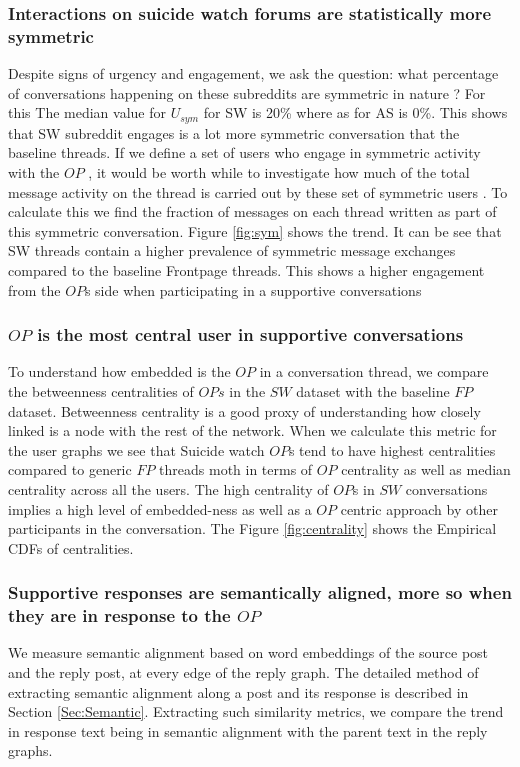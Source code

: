 \subsubsection{Interactions on suicide watch forums are statistically more symmetric}
Despite signs of urgency and engagement, we ask the question: what percentage of conversations happening on these subreddits are symmetric in nature ? 
For this The median value for $U_{sym}$ for SW is 20\% where as for AS is 0\%. This shows that SW subreddit engages is a lot more symmetric conversation that the baseline threads.
If we define a set of users who engage in symmetric activity with the $OP$ , it would be worth while to investigate how much of the total message activity on the thread is carried out by these set of symmetric users . To calculate this we find the fraction of messages on each thread written as part of this symmetric conversation. Figure \ref{fig:sym} shows the trend. It can be see that SW threads contain a higher prevalence of symmetric message exchanges compared to the baseline Frontpage threads. This shows a higher engagement from the $OP$s side when participating in a supportive conversations

\subsubsection{ $OP$ is the most central user in supportive conversations}
To understand how embedded is the $OP$ in a conversation thread, we compare the betweenness centralities of $OPs$ in the $SW$ dataset with the baseline $FP$ dataset. 
Betweenness centrality is a good proxy of understanding how closely linked is a node with the rest of the network. When we calculate this metric for the user graphs we see that Suicide watch $OP$s tend to have highest centralities compared to generic $FP$ threads moth in terms of $OP$ centrality as well as median centrality across all the users. The high centrality of $OP$s in $SW$ conversations implies a high level of embedded-ness as well as a $OP$ centric approach by other participants in the conversation. The Figure \ref{fig:centrality} shows the Empirical CDFs of centralities. 

\subsubsection{Supportive responses are semantically aligned, more so when they are in response to the $OP$}
We measure semantic alignment based on word embeddings of the source post and the reply post, at every edge of the reply graph. The detailed method of extracting semantic alignment along a post and its response is described in Section \ref{Sec:Semantic}. Extracting such similarity metrics, we compare the trend in response text being in semantic alignment with the parent text in the reply graphs. 


